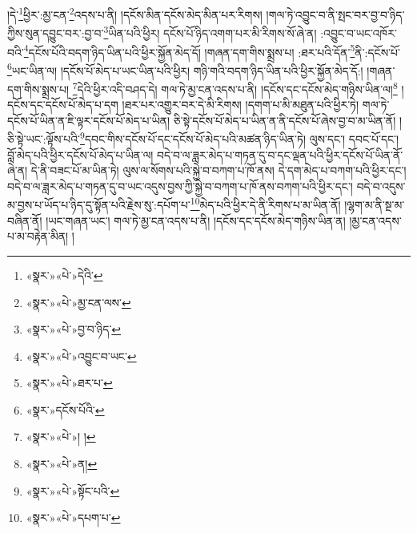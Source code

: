 །དེ་\footnote{«སྣར་»«པེ་»དེའི་}ཕྱིར་:མྱ་ངན་\footnote{«སྣར་»«པེ་»མྱ་ངན་ལས་}འདས་པ་ནི། །དངོས་མིན་དངོས་མེད་མིན་པར་རིགས། །གལ་ཏེ་འབྱུང་བ་ནི་སྤང་བར་བྱ་བ་ཉིད་ཀྱིས་སུན་དབྱུང་བར་:བྱ་བ་\footnote{«སྣར་»«པེ་»བྱ་བ་ཉིད་}ཡིན་པའི་ཕྱིར། དངོས་པོ་ཉིད་འགག་པར་མི་རིགས་སོ་ཞེ་ན། :འབྱུང་བ་ཡང་འཁོར་བའི་\footnote{«སྣར་»«པེ་»འབྱུང་བ་ཡང་}དངོས་པོའི་བདག་ཉིད་ཡིན་པའི་ཕྱིར་སྐྱོན་མེད་དོ། །གཞན་དག་གིས་སྨྲས་པ། :ཐར་པའི་དོན་\footnote{«སྣར་»«པེ་»ཐར་པ་}ནི་:དངོས་པོ་\footnote{«སྣར་»དངོས་པོའི་}ཡང་ཡིན་ལ། །དངོས་པོ་མེད་པ་ཡང་ཡིན་པའི་ཕྱིར། གཉི་གའི་བདག་ཉིད་ཡིན་པའི་ཕྱིར་སྐྱོན་མེད་དོ:། །གཞན་དག་གིས་སྨྲས་པ། \footnote{«སྣར་»«པེ་»། ། }དེའི་ཕྱིར་འདི་བཤད་དེ། གལ་ཏེ་མྱ་ངན་འདས་པ་ནི། །དངོས་དང་དངོས་མེད་གཉིས་ཡིན་ལ།\footnote{«སྣར་»«པེ་»ན།} །དངོས་དང་དངོས་པོ་མེད་པ་དག །ཐར་པར་འགྱུར་བར་དེ་མི་རིགས། །དགག་པ་མི་མཐུན་པའི་ཕྱིར་ཏེ། གལ་ཏེ་དངོས་པོ་ཡིན་ན་ཇི་ལྟར་དངོས་པོ་མེད་པ་ཡིན། ཅི་སྟེ་དངོས་པོ་མེད་པ་ཡིན་ན་ནི་དངོས་པོ་ཞེས་བྱ་བ་མ་ཡིན་ནོ། །ཅི་སྟེ་ཡང་:ལྟོས་པའི་\footnote{«སྣར་»«པེ་»སྟོང་པའི་}དབང་གིས་དངོས་པོ་དང་དངོས་པོ་མེད་པའི་མཚན་ཉིད་ཡིན་ཏེ། ལུས་དང་། དབང་པོ་དང་། བློ་མེད་པའི་ཕྱིར་དངོས་པོ་མེད་པ་ཡིན་ལ། བདེ་བ་ལ་ཟླར་མེད་པ་གཏན་དུ་བ་དང་ལྡན་པའི་ཕྱིར་དངོས་པོ་ཡིན་ནོ་ཞེ་ན། དེ་ནི་བཟང་པོ་མ་ཡིན་ཏེ། ལུས་ལ་སོགས་པའི་སྐྱེ་བ་བཀག་པ་ཁོ་ནས། དེ་དག་མེད་པ་བཀག་པའི་ཕྱིར་དང་། བདེ་བ་ལ་ཟླར་མེད་པ་གཏན་དུ་བ་ཡང་འདུས་བྱས་ཀྱི་སྐྱེ་བ་བཀག་པ་ཁོ་ནས་བཀག་པའི་ཕྱིར་དང་། བདེ་བ་འདུས་མ་བྱས་པ་ཡོད་པ་ཉིད་དུ་སྟོན་པའི་རྗེས་སུ་:དཔོག་པ་\footnote{«སྣར་»«པེ་»དཔག་པ་}མེད་པའི་ཕྱིར་དེ་ནི་རིགས་པ་མ་ཡིན་ནོ། །ལྷག་མ་ནི་སྔ་མ་བཞིན་ནོ། །ཡང་གཞན་ཡང་། གལ་ཏེ་མྱ་ངན་འདས་པ་ནི། །དངོས་དང་དངོས་མེད་གཉིས་ཡིན་ན། །མྱ་ངན་འདས་པ་མ་བརྟེན་མིན། །
